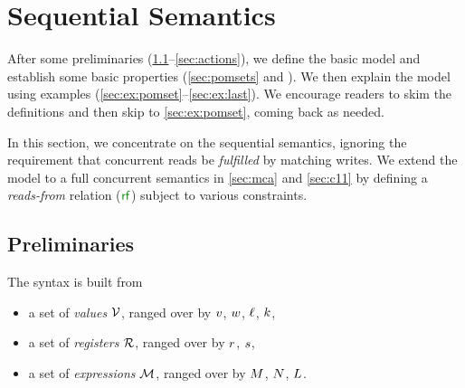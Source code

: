 \section{Sequential Semantics}
\label{sec:model}

After some preliminaries (\textsection\ref{sec:prelim}--\ref{sec:actions}),
we define the basic model and establish some basic properties
(\textsection\ref{sec:pomsets} and ).  We then explain the
model using examples (\textsection\ref{sec:ex:pomset}--\ref{sec:ex:last}).
We encourage readers to skim the definitions and then skip to
\textsection\ref{sec:ex:pomset}, coming back as needed.

In this section, we concentrate on the sequential semantics, ignoring the
requirement that concurrent reads be \emph{fulfilled} by matching writes. We
extend the model to a full concurrent semantics in \textsection\ref{sec:mca}
and \textsection\ref{sec:c11} by defining a \emph{reads-from} relation ($\rrfx$) subject
to various constraints.




\subsection{Preliminaries}
\label{sec:prelim}
The syntax is built from
\begin{itemize}
\item a set of \emph{values}
  $\mathcal{V}$, ranged over by $v$, $w$, $\ell$, $k$,
\item a set of \emph{registers} $\mathcal{R}$, ranged over by
  $r$, $s$,
\item a set of \emph{expressions} $\mathcal{M}$, ranged over by
  $M$, $N$,  $L$.
\end{itemize}


